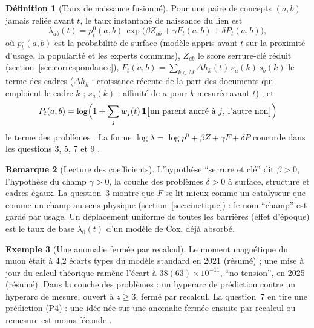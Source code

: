 \documentclass[11pt,a4paper]{article}
\theoremstyle{definition}
\newtheorem{definition}{Définition}[section]
\newtheorem{exemple}[definition]{Exemple}
\newtheorem{remarque}[definition]{Remarque}
\theoremstyle{plain}
\begin{document}
\begin{definition}[Taux de naissance fusionné]
\label{def:taux}
Pour une paire de concepts $(a,b)$ jamais reliée avant $t$, le taux instantané de naissance du lien
est
\begin{equation}\label{eq:taux}
\lambda_{ab}(t)=p^0_t(a,b)\,\exp\bigl(\beta Z_{ab}+\gamma F_t(a,b)+\delta P_t(a,b)\bigr),
\end{equation}
où $p^0_t(a,b)$ est la probabilité de surface (modèle appris avant $t$ sur la proximité d'usage, la
popularité et les experts communs), $Z_{ab}$ le score serrure-clé réduit
(section~\ref{sec:correspondance}), $F_t(a,b)=\sum_{k\in M}\Delta h_k(t)\,s_a(k)\,s_b(k)$ le terme
des cadres ($\Delta h_k$ : croissance récente de la part des documents qui emploient le cadre $k$ ;
$s_a(k)$ : affinité de $a$ pour $k$ mesurée avant $t$) \cite[partie~2]{fable}, et
\begin{equation}\label{eq:P}
P_t(a,b)=\log\Bigl(1+\sum_j w_j(t)\,\mathbf{1}\bigl[\text{un parent ancré à }j\text{, l'autre non}\bigr]\Bigr)
\end{equation}
le terme des problèmes \cite[section~5]{q7}. La forme $\log\lambda=\log p^0+\beta Z+\gamma F+\delta P$
concorde dans les questions 3, 5, 7 et 9 \cite[contradictions, point~3]{contrelecture}.
\end{definition}

\begin{remarque}[Lecture des coefficients]
L'hypothèse \enquote{serrure et clé} dit $\beta>0$, l'hypothèse du champ $\gamma>0$, la couche des
problèmes $\delta>0$ à surface, structure et cadres égaux. La question~3 montre que $F$ se lit mieux
comme un catalyseur que comme un champ au sens physique (section~\ref{sec:cinetique}) : le nom
\enquote{champ} est gardé par usage. Un déplacement uniforme de toutes les barrières (effet
d'époque) est le taux de base $\lambda_0(t)$ d'un modèle de Cox, déjà absorbé.
\end{remarque}

\begin{exemple}[Une anomalie fermée par recalcul]
Le moment magnétique du muon était à 4,2 écarts types du modèle standard en 2021 \cite{abi2021}
(résumé) ; une mise à jour du calcul théorique ramène l'écart à $38(63)\times10^{-11}$, \enquote{no
tension}, en 2025 \cite{aliberti2025} (résumé). Dans la couche des problèmes : un hyperarc de
prédiction contre un hyperarc de mesure, ouvert à $z\ge3$, fermé par recalcul. La question~7 en
tire une prédiction (P4) : une idée née sur une anomalie fermée ensuite par recalcul ou remesure
est moins féconde \cite[section~5]{q7}.
\end{exemple}
\end{document}
